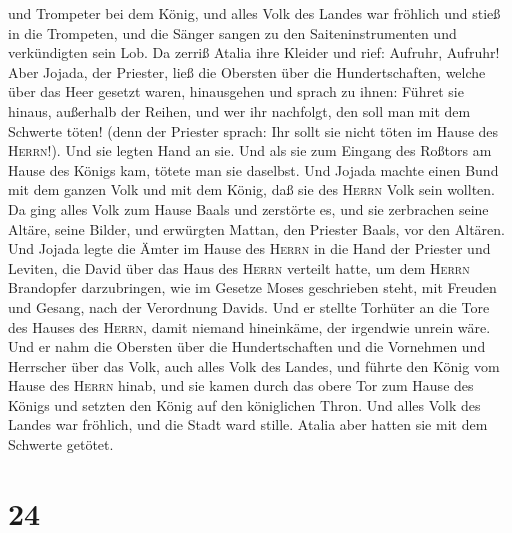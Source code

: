 und Trompeter bei dem König, und alles Volk des Landes war fröhlich und
stieß in die Trompeten, und die Sänger sangen zu den Saiteninstrumenten
und verkündigten sein Lob. Da zerriß Atalia ihre Kleider und rief:
Aufruhr, Aufruhr!  Aber Jojada, der Priester, ließ die
Obersten über die Hundertschaften, welche über das Heer gesetzt waren,
hinausgehen und sprach zu ihnen: Führet sie hinaus, außerhalb der
Reihen, und wer ihr nachfolgt, den soll man mit dem Schwerte töten!
(denn der Priester sprach: Ihr sollt sie nicht töten im Hause des
\textsc{Herrn}!).  Und sie legten Hand an sie. Und als
sie zum Eingang des Roßtors am Hause des Königs kam, tötete man sie
daselbst.  Und Jojada machte einen Bund mit dem ganzen
Volk und mit dem König, daß sie des \textsc{Herrn} Volk sein wollten.
 Da ging alles Volk zum Hause Baals und zerstörte es, und
sie zerbrachen seine Altäre, seine Bilder, und erwürgten Mattan, den
Priester Baals, vor den Altären.  Und Jojada legte die
Ämter im Hause des \textsc{Herrn} in die Hand der Priester und Leviten,
die David über das Haus des \textsc{Herrn} verteilt hatte, um dem
\textsc{Herrn} Brandopfer darzubringen, wie im Gesetze Moses geschrieben
steht, mit Freuden und Gesang, nach der Verordnung Davids.
 Und er stellte Torhüter an die Tore des Hauses des
\textsc{Herrn}, damit niemand hineinkäme, der irgendwie unrein wäre.
 Und er nahm die Obersten über die Hundertschaften und
die Vornehmen und Herrscher über das Volk, auch alles Volk des Landes,
und führte den König vom Hause des \textsc{Herrn} hinab, und sie kamen
durch das obere Tor zum Hause des Königs und setzten den König auf den
königlichen Thron.  Und alles Volk des Landes war
fröhlich, und die Stadt ward stille. Atalia aber hatten sie mit dem
Schwerte getötet.

\hypertarget{section-23}{%
\section{24}\label{section-23}}

